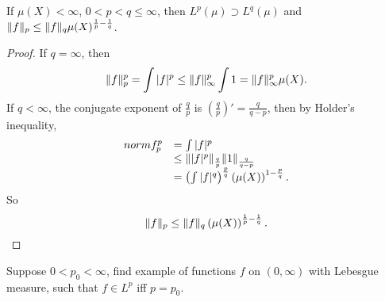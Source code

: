 \begin{prop}
    \label{Prop:LpContainLq}
    If $\mu(X)<\infty$, $0<p<q\le\infty$, then 
    $L^{p}(\mu)\supset L^{q}(\mu)$ and 
    $\|f\|_{p}\le\|f\|_{q}\mu(X)^{\frac{1}{p}-\frac{1}{q}}$.
\end{prop}
\begin{proof}
    If $q=\infty$, then 
    \begin{displaymath}
        \|f\|_{p}^{p}=\int|f|^{p}\le\|f\|_{\infty}^{p}\int 1
        =\|f\|_{\infty}^{p}\mu(X).
    \end{displaymath}
    If $q<\infty$, the conjugate exponent of $\frac{q}{p}$ is 
    $\left(\frac{q}{p}\right)'=\frac{q}{q-p}$, then by Holder's 
    inequality, 
    \begin{displaymath}
        \begin{array}{rl}
            norm{f}_{p}^{p}&=\int|f|^{p}\\
            &\le\||f|^{p}\|_{\frac{q}{p}}\|1\|_{\frac{q}{q-p}}\\
            &=\left(\int|f|^{q}\right)^{\frac{p}{q}}
            \left(\mu(X)\right)^{1-\frac{p}{q}}.\\
        \end{array}
    \end{displaymath}
    So 
    \begin{displaymath}
        \|f\|_{p}\le\|f\|_{q}
        \left(\mu(X)\right)^{\frac{1}{p}-\frac{1}{q}}.
    \end{displaymath}
\end{proof}
\begin{exc}
    Suppose $0<p_0<\infty$, find example of functions $f$ 
    on $(0,\infty)$ with Lebesgue measure, such that $f\in L^{p}$ 
    iff $p=p_{0}$.
\end{exc}
